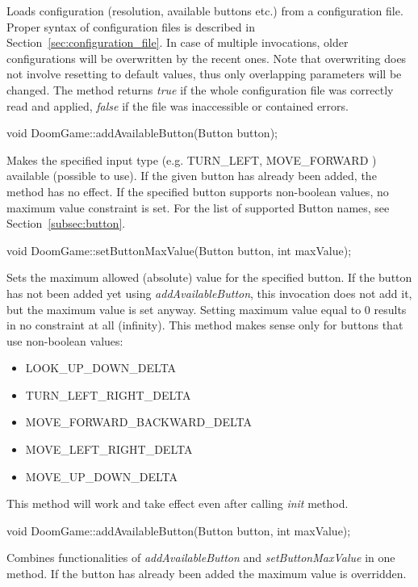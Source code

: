 \documentclass[english,bachelor,a4paper,twoside]{ppfcmthesis}
\begin{document}
	Loads configuration (resolution, available buttons etc.) from a configuration file. Proper syntax of configuration files is described in Section~\ref{sec:configuration_file}. In case of multiple invocations, older configurations will be overwritten by the recent ones. Note that overwriting does not involve resetting to default values, thus only overlapping parameters will be changed. The method returns \emph{true} if the whole configuration file was correctly read and applied, \emph{false} if the file was inaccessible or contained errors.


\vspace{20pt}
\begin{clinee}
void DoomGame::addAvailableButton(Button button);
\end{clinee}

	Makes the specified input type (e.g. TURN\_LEFT, MOVE\_FORWARD ) available (possible to use). If the given button has already been added, the method has no effect. If the specified button supports non-boolean values, no maximum value constraint is set. For the list of supported Button names, see Section~\ref{subsec:button}.


\vspace{20pt}
\begin{clinee}
void DoomGame::setButtonMaxValue(Button button, int maxValue);
\end{clinee}
	Sets the maximum allowed (absolute) value for the specified button. If the button has not been added yet using \emph{addAvailableButton}, this invocation does not add it, but the maximum value is set anyway. Setting maximum value equal to 0 results in no constraint at all (infinity). This method makes sense only for buttons that use non-boolean values:  
	\begin{itemize}
		\item LOOK\_UP\_DOWN\_DELTA
		\item TURN\_LEFT\_RIGHT\_DELTA
		\item MOVE\_FORWARD\_BACKWARD\_DELTA
		\item MOVE\_LEFT\_RIGHT\_DELTA
		\item MOVE\_UP\_DOWN\_DELTA
 	\end{itemize}
This method will work and take effect even after calling \emph{init} method.


\vspace{20pt}
\begin{clinee}
void DoomGame::addAvailableButton(Button button, int maxValue);
\end{clinee}
	Combines functionalities of \emph{addAvailableButton} and \emph{setButtonMaxValue} in one method. If the button has already been added the maximum value is overridden. 
\end{document}
